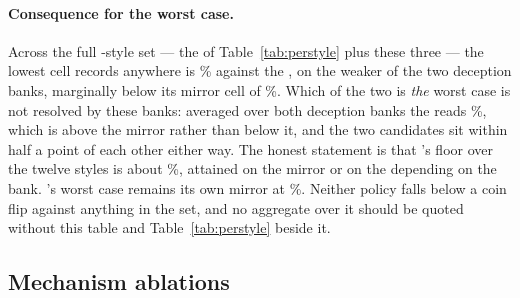 \paragraph{Consequence for the worst case.} Across the full
\numTwelveStyles{}-style set --- the \numVfiveStyleN{} of
Table~\ref{tab:perstyle} plus these three --- the lowest cell \vfive{} records
anywhere is \numDecWorst\% against the \numDecWorstOpp{}, on the weaker of the
two deception banks, marginally below its mirror cell of \numVfiveWorst\%.
Which of the two is \emph{the} worst case is not resolved by these banks:
averaged over both deception banks the \numDecWorstOpp{} reads
\numDecFeintFive\%, which is above the mirror rather than below it, and the two
candidates sit within half a point of each other either way. The honest
statement is that \vfive{}'s floor over the twelve styles is about
\numVfiveWorst\%, attained on the mirror or on the \numDecWorstOpp{} depending on
the bank. \vfour{}'s worst case remains its own mirror at \numVfourWorst\%.
Neither policy falls below a coin flip against anything in the set, and no
aggregate over it should be quoted without this table and
Table~\ref{tab:perstyle} beside it.

\subsection{Mechanism ablations}
\label{sec:results-ablations}

